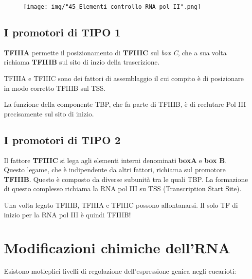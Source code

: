 \documentclass[11pt]{book}
\begin{document}
\begin{figure}[htp]
\centering
\texttt{[image: img/"45\_Elementi controllo RNA pol II".png]}
\caption{}
\label{elementi-controllo-rna-pol-ii}
\end{figure}

\section{I promotori di TIPO 1}\label{i-promotori-di-tipo-1}

\textbf{TFIIIA} permette il posizionamento di \textbf{TFIIIC} sul
\emph{box C}, che a sua volta richiama \textbf{TFIIIB} sul sito di inzio
della trascrizione.

TFIIIA e TFIIIC sono dei fattori di assemblaggio il cui compito è di
posizionare in modo corretto TFIIIB sul TSS.

La funzione della componente TBP, che fa parte di TFIIIB, è di reclutare
Pol III precisamente sul sito di inizio.

\section{I promotori di TIPO 2}\label{i-promotori-di-tipo-2}

Il fattore \textbf{TFIIIC} si lega agli elementi interni denominati
\textbf{boxA} e \textbf{box B}. Questo legame, che è indipendente da
altri fattori, richiama sul promotore \textbf{TFIIIB}. Questo è composto
da diverse subunità tra le quali TBP. La formazione di questo complesso
richiama la RNA pol III su TSS (Transcription Start Site).

Una volta legato TFIIIB, TFIIIA e TFIIIC possono allontanarsi. Il solo
TF di inizio per la RNA pol III è quindi TFIIIB!

\chapter{Modificazioni chimiche
dell'RNA}\label{modificazioni-chimiche-dellrna}

Esistono motleplici livelli di regolazione dell'espressione genica negli
eucarioti:
\end{document}
